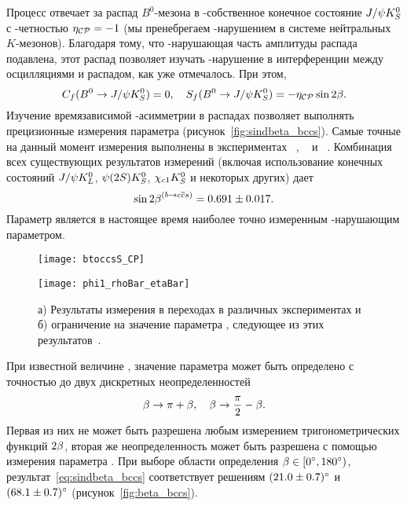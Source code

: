 Процесс \btoccs отвечает за распад $B^0$-мезона в \cpconj-собственное конечное состояние $J/\psi K_S^0$ с \cpconj-четностью $\eta_{\mathcal{CP}} = -1$ (мы пренебрегаем \cpconj-нарушением в системе нейтральных $K$-мезонов).  Благодаря тому, что \cpconj-нарушающая часть амплитуды распада \bjpsiks подавлена, этот распад позволяет изучать \cpconj-нарушение в интерференции между осцилляциями и распадом, как уже отмечалось.  При этом,
\begin{equation}\label{eq:acp_bccs}
 C_f(B^0\to J/\psi K_S^0) = 0,\quad S_f(B^0\to J/\psi K_S^0) = -\eta_\mathcal{CP}\sin{2\ensuremath{\beta}}.
\end{equation}
Изучение времязависимой \cpconj-асимметрии в распадах \bjpsiks позволяет выполнять прецизионные измерения параметра \sindbeta (рисунок~\ref{fig:sindbeta_bccs}).  Самые точные на данный момент измерения выполнены в экспериментах \belle~\cite{belle_sinbeta}, \babar~\cite{babar_sinbeta} и \lhcb~\cite{lhcb_sinbeta}.  Комбинация всех существующих результатов измерений (включая использование конечных состояний $J/\psi K_L^0$, $\psi(2S)K_S^0$, $\chi_{c1}K_S^0$ и некоторых других) дает~\cite{hfag} 
\begin{equation}\label{eq:sindbeta_bccs}
 \sin{2\ensuremath{\beta}}^{(b\to c\overline{c}s)} = 0.691 \pm 0.017.
\end{equation}
Параметр \sindbeta является в настоящее время наиболее точно измеренным \cpconj-нарушающим параметром.

\begin{figure}[htb]
\begin{minipage}[b]{0.5\textwidth}
 \centering
 \texttt{[image: btoccsS\_CP]}
 \subcaption{}
 \label{fig:sindbeta_bccs}
\end{minipage}
\begin{minipage}[b]{0.5\textwidth}
 \centering
 \texttt{[image: phi1\_rhoBar\_etaBar]}
 \subcaption{}
 \label{fig:beta_bccs}
\end{minipage}
 \caption{а) Результаты измерения \sindbeta в переходах \btoccs в различных экспериментах и б) ограничение на значение параметра \pphi, следующее из этих результатов~\cite{hfag}.}
 \label{fig:sinbeta}
\end{figure}

При известной величине \sindbeta, значение параметра \pphi может быть определено с точностью до двух дискретных неопределенностей
\begin{equation}
 \beta \to \pi + \beta,\quad \beta \to \frac{\pi}{2} - \beta.
\end{equation}
Первая из них не может быть разрешена любым измерением тригонометрических функций $2\beta$, вторая же неопределенность может быть разрешена с помощью измерения параметра \cosdbeta.  При выборе области определения $\beta\in[0^{\circ},180^{\circ})$, результат~\eqref{eq:sindbeta_bccs} соответствует решениям $(21.0\pm0.7)^{\circ}$ и $(68.1\pm0.7)^{\circ}$ (рисунок~\ref{fig:beta_bccs}).  

